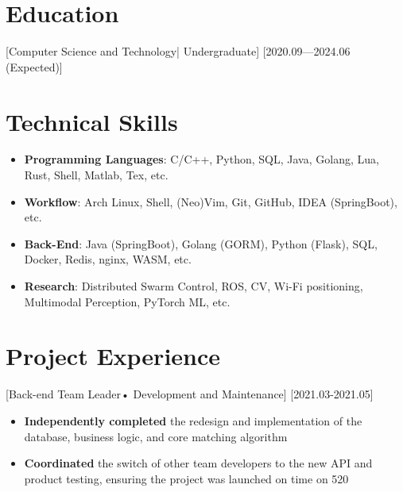 \documentclass{resume}
\begin{document}


    \ResumeTitle

    \section{Education}
    [\textnormal{Computer Science and Technology|} Undergraduate]
    [2020.09—2024.06 (Expected)]


    \section[Technical Skills]{Technical Skills\protect}
    \begin{itemize}
        \item \textbf{Programming Languages}: C/C++, Python, SQL, Java, Golang, Lua, Rust, Shell, Matlab, Tex, etc.
        \item \textbf{Workflow}: Arch Linux, Shell, (Neo)Vim, Git, GitHub, IDEA (SpringBoot), etc.
        \item \textbf{Back-End}: Java (SpringBoot), Golang (GORM), Python (Flask), SQL, Docker, Redis, nginx, WASM, etc.
        \item \textbf{Research}: Distributed Swarm Control, ROS, CV, Wi-Fi positioning, Multimodal Perception, PyTorch ML, etc.
    \end{itemize}

    \section{Project Experience}

    [Back-end Team Leader• Development and Maintenance]
    [2021.03-2021.05] 

    \begin{itemize}
        \item \textbf{Independently completed} the redesign and implementation of the database, business logic, and core matching algorithm
        \item \textbf{Coordinated} the switch of other team developers to the new API and product testing, ensuring the project was launched on time on 520
    \end{itemize}
\end{document}
